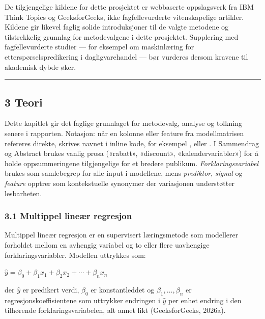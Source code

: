 \documentclass[
  11pt,
]{article}
\newcommand{\splitcode}[1]{{\ttfamily\seqsplit{#1}}}
\begin{document}
De tilgjengelige kildene for dette prosjektet er webbaserte oppslagsverk fra IBM Think Topics og GeeksforGeeks, ikke
fagfellevurderte vitenskapelige artikler. Kildene gir likevel faglig solide introduksjoner til de valgte metodene og
tilstrekkelig grunnlag for metodevalgene i dette prosjektet. Supplering med fagfellevurderte studier --- for eksempel om
maskinlæring for etterspørselspredikering i dagligvarehandel --- bør vurderes dersom kravene til akademisk dybde øker.

\begin{center}\rule{0.5\linewidth}{0.5pt}\end{center}

\hypertarget{teori}{%
\subsection{3 Teori}\label{teori}}

Dette kapitlet gir det faglige grunnlaget for metodevalg, analyse og tolkning senere i rapporten. Notasjon: når en
kolonne eller feature fra modellmatrisen refereres direkte, skrives navnet i inline kode, for eksempel
\splitcode{Discount}, \splitcode{Region\_North} eller \splitcode{dayofmonth}. I Sammendrag og Abstract brukes vanlig
prosa («rabatt», «discount», «kalendervariabler») for å holde oppsummeringene tilgjengelige for et bredere publikum.
\emph{Forklaringsvariabel} brukes som samlebegrep for alle input i modellene, mens \emph{prediktor}, \emph{signal} og
\emph{feature} opptrer som kontekstuelle synonymer der variasjonen understøtter lesbarheten.

\hypertarget{multippel-lineuxe6r-regresjon}{%
\subsubsection{3.1 Multippel lineær regresjon}\label{multippel-lineuxe6r-regresjon}}

Multippel lineær regresjon er en supervisert læringsmetode som modellerer forholdet mellom en avhengig variabel og to
eller flere uavhengige forklaringsvariabler. Modellen uttrykkes som:

\(\hat{y} = \beta_0 + \beta_1 x_1 + \beta_2 x_2 + \cdots + \beta_n x_n\)

der \(\hat{y}\) er predikert verdi, \(\beta_0\) er konstantleddet og \(\beta_1, \ldots, \beta_n\) er
regresjonskoeffisientene som uttrykker endringen i \(\hat{y}\) per enhet endring i den tilhørende forklaringsvariabelen,
alt annet likt (GeeksforGeeks, 2026a).
\end{document}
